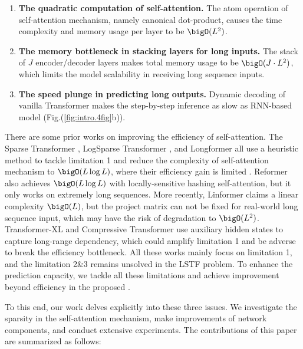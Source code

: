 \begin{enumerate}[nosep, leftmargin=0.45cm]
    \item \textbf{The quadratic computation of self-attention.} The atom operation of self-attention mechanism, namely canonical dot-product, causes the time complexity and memory usage per layer to be $\bigO(L^2)$. 
    \item \textbf{The memory bottleneck in stacking layers for long inputs.} The stack of $J$ encoder/decoder layers makes total memory usage to be $\bigO(J \cdot L^2)$, which limits the model scalability in receiving long sequence inputs.
    \item \textbf{The speed plunge in predicting long outputs.} Dynamic decoding of vanilla Transformer makes the step-by-step inference as slow as RNN-based model (Fig.(\ref{fig:intro.4fig}b)).
\end{enumerate}
There are some prior works on improving the efficiency of self-attention. The Sparse Transformer \cite{child2019generating}, LogSparse Transformer \cite{li2019enhancing}, and Longformer \cite{DBLP:journals/corr/abs-2004-05150} all use a heuristic method to tackle limitation 1 and reduce the complexity of self-attention mechanism to $\bigO(L \log L)$, where their efficiency gain is limited \cite{qiu2019blockwise}. Reformer \cite{kitaev2019reformer} also achieves $\bigO(L \log L)$ with locally-sensitive hashing self-attention, but it only works on extremely long sequences. More recently, Linformer \cite{wang2020linformer} claims a linear complexity $\bigO(L)$, but the project matrix can not be fixed for real-world long sequence input, which may have the risk of degradation to $\bigO(L^2)$. Transformer-XL \cite{dai2019transformer} and Compressive Transformer \cite{rae2019compressive} use auxiliary hidden states to capture long-range dependency, which could amplify limitation 1 and be adverse to break the efficiency bottleneck. All these works mainly focus on limitation 1, and the limitation 2\&3 remains unsolved in the LSTF problem. To enhance the prediction capacity, we tackle all these limitations and achieve improvement beyond efficiency in the proposed \mn.

To this end, our work delves explicitly into these three issues.  We investigate the sparsity in the self-attention mechanism, make improvements of network components, and conduct extensive experiments.
The contributions of this paper are summarized as follows:

